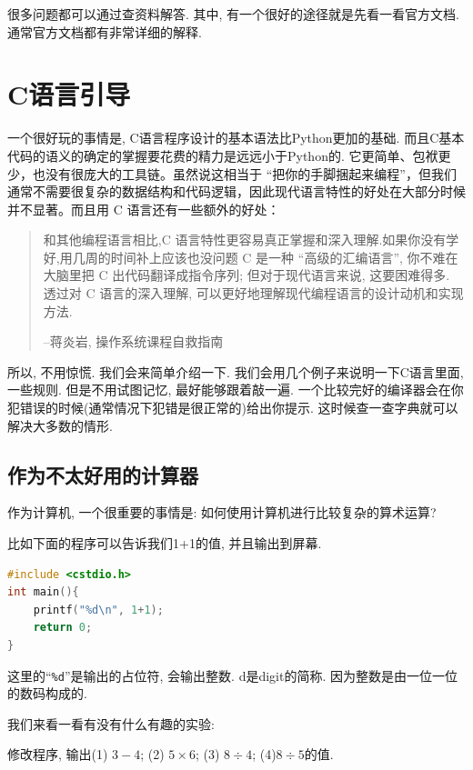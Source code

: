 很多问题都可以通过查资料解答. 其中, 有一个很好的途径就是先看一看官方文档. 通常官方文档都有非常详细的解释. 


\section{C语言引导}

一个很好玩的事情是, C语言程序设计的基本语法比Python更加的基础. 而且C基本代码的语义的确定的掌握要花费的精力是远远小于Python的. 它更简单、包袱更少，也没有很庞大的工具链。虽然说这相当于 “把你的手脚捆起来编程”，但我们通常不需要很复杂的数据结构和代码逻辑，因此现代语言特性的好处在大部分时候并不显著。而且用 C 语言还有一些额外的好处：

\begin{quote}
	和其他编程语言相比,C 语言特性更容易真正掌握和深入理解.如果你没有学好,用几周的时间补上应该也没问题
	C 是一种 “高级的汇编语言”, 你不难在大脑里把 C 出代码翻译成指令序列; 但对于现代语言来说, 这要困难得多. 
	透过对 C 语言的深入理解, 可以更好地理解现代编程语言的设计动机和实现方法. 
	
	 \hfill --蒋炎岩, 操作系统课程自救指南 

\end{quote}

所以, 不用惊慌. 我们会来简单介绍一下. 我们会用几个例子来说明一下C语言里面, 一些规则. 但是不用试图记忆, 最好能够跟着敲一遍. 一个比较完好的编译器会在你犯错误的时候(通常情况下犯错是很正常的)给出你提示. 这时候查一查字典就可以解决大多数的情形. 

\subsection{作为不太好用的计算器}
作为计算机, 一个很重要的事情是: 如何使用计算机进行比较复杂的算术运算? 

比如下面的程序可以告诉我们1+1的值, 并且输出到屏幕. 

\begin{lstlisting}[language=C]
#include <cstdio.h>
int main(){
	printf("%d\n", 1+1);
	return 0;
}
\end{lstlisting}

这里的``\texttt{\%d}''是输出的占位符, 会输出整数. d是digit的简称. 因为整数是由一位一位的数码构成的. 

我们来看一看有没有什么有趣的实验: 

\begin{example}
	修改程序, 输出(1) $3-4$; (2) $5\times 6$; (3) $8\div 4$; (4)$8\div 5$的值.
\end{example}

